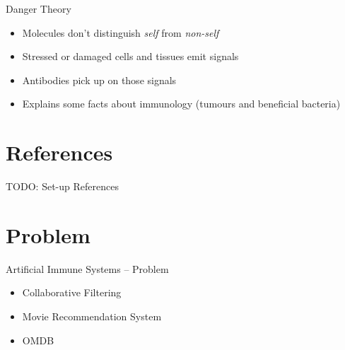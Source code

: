 \documentclass[xcolor=svgnames]{beamer}
\begin{document}
    \begin{frame}{Danger Theory}
		    \begin{itemize}
		        \item Molecules don't distinguish \textit{self} from \textit{non-self}
		        \item Stressed or damaged cells and tissues emit signals
		        \item Antibodies pick up on those signals
		        \item Explains some facts about immunology (tumours and beneficial bacteria)
		    \end{itemize}
		\end{frame}

         
    \section{References}
    
    \begin{frame}
    	TODO: Set-up References
    \end{frame}     
            
    \section{Problem}
    
    	\begin{frame}{Artificial Immune Systems -- Problem}
        	 
            \begin{itemize}
				\item Collaborative Filtering
                \item Movie Recommendation System
                \item OMDB
			\end{itemize}
            
       \end{frame}
\end{document}
